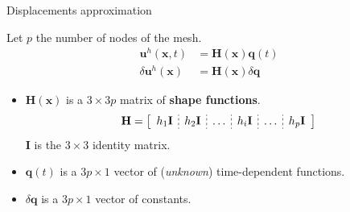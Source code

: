 \documentclass[aspectratio=169]{beamer}
\begin{document}
{
\begin{frame}{Displacements approximation}
  \begin{block}{}
    Let $p$ the number of nodes of the mesh.
    \vspace{-.2cm}
    \begin{align*}
      \mathbf u^{h}(\mathbf x,t)     & =\mathbf H(\mathbf x)\mathbf q(t)    \\
      \delta\mathbf u^{h}(\mathbf x) & =\mathbf H(\mathbf x)\delta\mathbf q
    \end{align*}
    \vspace{-.8cm}
    \begin{itemize}
      \item $\mathbf H(\mathbf x)$ is a $3\times 3p$ matrix of \textbf{shape functions}.
            $$
              \mathbf H
              =\left[
                \begin{array}{c;{2pt/2pt}c;{2pt/2pt}c;{2pt/2pt}c;{2pt/2pt}c;{2pt/2pt}c}
                  h_{1}\mathbf I & h_{2}\mathbf I & \dots & h_{i}\mathbf I & \dots & h_{p}\mathbf I \\
                \end{array} \right]
            $$
            $\mathbf I$ is the $3\times 3$ identity matrix.
      \item $\mathbf q(t)$ is a $3p\times 1$ vector of (\emph{unknown}) time-dependent functions.
      \item $\delta \mathbf q$ is a $3p\times 1$ vector of constants.
    \end{itemize}


  \end{block}
\end{frame}
}
\end{document}
